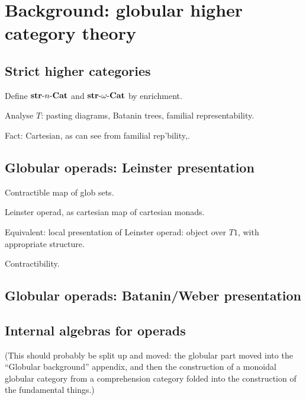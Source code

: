 
\chapter{Background: globular higher category theory}


\section{Strict higher categories}

\para Define $\strnCat$ and $\strnCat[\omega]$ by enrichment. 


\para Analyse $T$: pasting diagrams, Batanin trees, familial representability.

Fact: Cartesian, as can see from familial rep'bility\cite{street:petit-topos},\cite{carboni-johnstone}.

\section{Globular operads: Leinster presentation}

 Contractible map of glob sets.

 Leinster operad, as cartesian map of cartesian monads.

\para Equivalent: local presentation of Leinster operad: object over $T1$, with appropriate structure.

\para Contractibility.



\section{Globular operads: Batanin/Weber presentation}

\section{Internal algebras for operads}  (This should probably be split up and moved: the globular part moved into the ``Globular background'' appendix, and then the construction of a monoidal globular category from a comprehension category folded into the construction of the fundamental things.)

